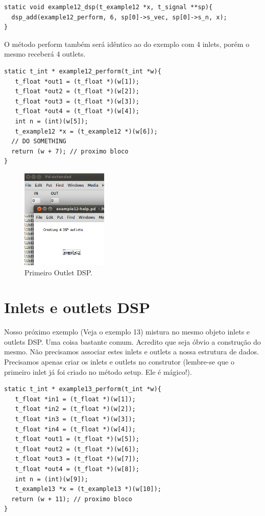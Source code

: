 \documentclass[10pt,a4paper]{report}
\begin{document}
\begin{lstlisting}
static void example12_dsp(t_example12 *x, t_signal **sp){
  dsp_add(example12_perform, 6, sp[0]->s_vec, sp[0]->s_n, x);
}
\end{lstlisting}

O método perform também será idêntico ao do exemplo com 4 inlets, porém o mesmo receberá 4 outlets.

\begin{lstlisting}
static t_int * example12_perform(t_int *w){
   t_float *out1 = (t_float *)(w[1]);
   t_float *out2 = (t_float *)(w[2]);
   t_float *out3 = (t_float *)(w[3]);
   t_float *out4 = (t_float *)(w[4]);
   int n = (int)(w[5]);
   t_example12 *x = (t_example12 *)(w[6]);
  // DO SOMETHING
  return (w + 7); // proximo bloco
}
\end{lstlisting}

\begin{figure}[h!]
	\centering
	\includegraphics[height=180]{./images/example12}
	\caption{Primeiro Outlet DSP.}
\end{figure}

\section{Inlets e outlets DSP}
Nosso próximo exemplo (Veja o exemplo 13) mistura no mesmo objeto inlets e outlets DSP. Uma coisa bastante comum. Acredito que seja óbvio a construção do mesmo. Não precisamos associar estes inlets e outlets a nossa estrutura de dados. Precisamos apenas criar os inlets e outlets no construtor (lembre-se que o primeiro inlet já foi criado no método setup. Ele é mágico!).

\begin{lstlisting}
static t_int * example13_perform(t_int *w){
   t_float *in1 = (t_float *)(w[1]);
   t_float *in2 = (t_float *)(w[2]);
   t_float *in3 = (t_float *)(w[3]);
   t_float *in4 = (t_float *)(w[4]);
   t_float *out1 = (t_float *)(w[5]);
   t_float *out2 = (t_float *)(w[6]);
   t_float *out3 = (t_float *)(w[7]);
   t_float *out4 = (t_float *)(w[8]);
   int n = (int)(w[9]);
   t_example13 *x = (t_example13 *)(w[10]);
  return (w + 11); // proximo bloco
}
\end{lstlisting}
\end{document}
